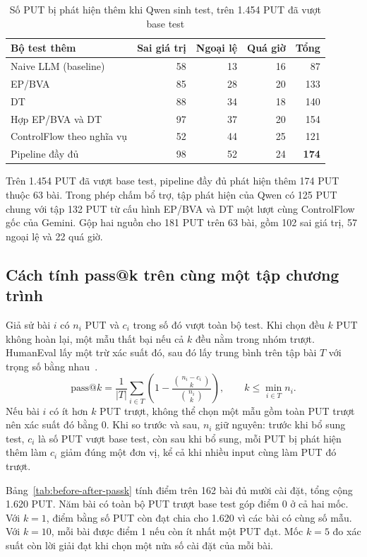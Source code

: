 \begin{table}[!htbp]
\centering
\caption[Phát hiện thêm trên HumanEval khi Qwen sinh test]{Số PUT bị phát hiện thêm khi Qwen sinh test, trên 1.454 PUT đã vượt base test}
\label{tab:extra-detections}
\small
\begin{tabular*}{\linewidth}{@{\extracolsep{\fill}}lrrrr@{}}
\toprule
Bộ test thêm & Sai giá trị & Ngoại lệ & Quá giờ & Tổng \\
\midrule
Naive LLM (baseline) & 58 & 13 & 16 & 87 \\
\midrule
EP/BVA & 85 & 28 & 20 & 133 \\
DT & 88 & 34 & 18 & 140 \\
Hợp EP/BVA và DT & 97 & 37 & 20 & 154 \\
ControlFlow theo nghĩa vụ & 52 & 44 & 25 & 121 \\
\midrule
Pipeline đầy đủ & 98 & 52 & 24 & \textbf{174} \\
\bottomrule
\end{tabular*}
\end{table}

Trên 1.454 PUT đã vượt base test, pipeline đầy đủ phát hiện thêm 174 PUT thuộc 63 bài. Trong phép chấm bổ trợ, tập phát hiện của Qwen có 125 PUT chung với tập 132 PUT từ cấu hình EP/BVA và DT một lượt cùng ControlFlow gốc của Gemini. Gộp hai nguồn cho 181 PUT trên 63 bài, gồm 102 sai giá trị, 57 ngoại lệ và 22 quá giờ.

\subsection{Cách tính pass@k trên cùng một tập chương trình}

Giả sử bài \(i\) có \(n_i\) PUT và \(c_i\) trong số đó vượt toàn bộ test. Khi chọn đều \(k\) PUT không hoàn lại, một mẫu thất bại nếu cả \(k\) đều nằm trong nhóm trượt. HumanEval lấy một trừ xác suất đó, sau đó lấy trung bình trên tập bài \(T\) với trọng số bằng nhau~\cite{chen2021evaluating,openaiHumanEvalScoring}.
\[
  \mathrm{pass@}k=\frac{1}{|T|}\sum_{i\in T}
  \left(1-\frac{\binom{n_i-c_i}{k}}{\binom{n_i}{k}}\right),
  \qquad k\leq \min_{i\in T} n_i .
\]
Nếu bài \(i\) có ít hơn \(k\) PUT trượt, không thể chọn một mẫu gồm toàn PUT trượt nên xác suất đó bằng 0. Khi so trước và sau, \(n_i\) giữ nguyên: trước khi bổ sung test, \(c_i\) là số PUT vượt base test, còn sau khi bổ sung, mỗi PUT bị phát hiện thêm làm \(c_i\) giảm đúng một đơn vị, kể cả khi nhiều input cùng làm PUT đó trượt.

Bảng~\ref{tab:before-after-passk} tính điểm trên 162 bài đủ mười cài đặt, tổng cộng 1.620 PUT. Năm bài có toàn bộ PUT trượt base test góp điểm 0 ở cả hai mốc. Với \(k=1\), điểm bằng số PUT còn đạt chia cho 1.620 vì các bài có cùng số mẫu. Với \(k=10\), mỗi bài được điểm 1 nếu còn ít nhất một PUT đạt. Mốc \(k=5\) đo xác suất còn lời giải đạt khi chọn một nửa số cài đặt của mỗi bài.

